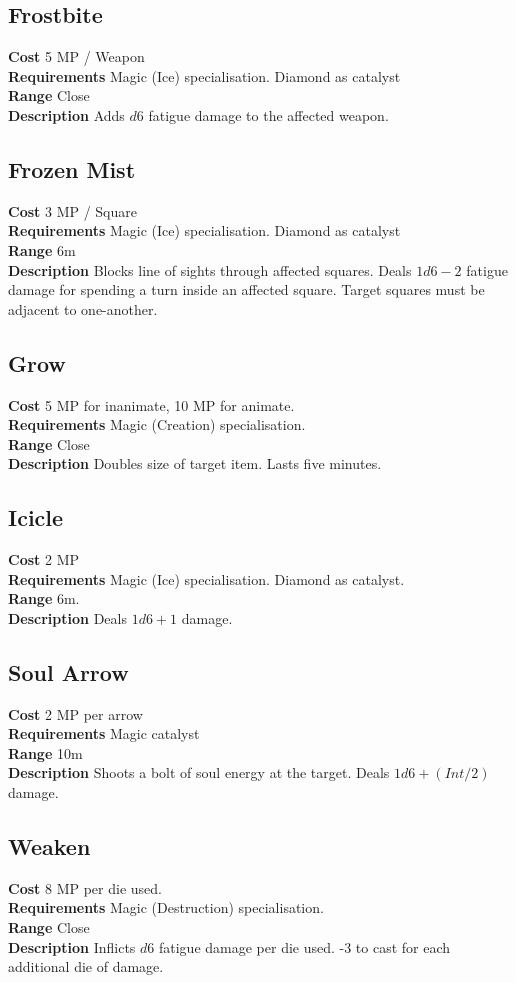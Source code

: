 \subsection*{Frostbite}
\textbf{Cost} 5 MP / Weapon\\
\textbf{Requirements} Magic (Ice) specialisation.
Diamond as catalyst\\
\textbf{Range} Close\\
\textbf{Description} Adds $d6$ fatigue damage to the affected weapon.

\subsection*{Frozen Mist} 
\textbf{Cost} 3 MP / Square\\
\textbf{Requirements} Magic (Ice) specialisation. 
Diamond as catalyst\\
\textbf{Range} 6m\\
\textbf{Description} Blocks line of sights through affected squares. 
Deals $1d6-2$ fatigue damage for spending a turn inside an affected square.
Target squares must be adjacent to one-another.

\subsection*{Grow}
\textbf{Cost} 5 MP for inanimate, 10 MP for animate.\\
\textbf{Requirements} Magic (Creation) specialisation. \\
\textbf{Range} Close\\
\textbf{Description} Doubles size of target item. 
Lasts five minutes.

\subsection*{Icicle}
\textbf{Cost} 2 MP\\
\textbf{Requirements} Magic (Ice) specialisation. 
Diamond as catalyst.\\
\textbf{Range} 6m.\\
\textbf{Description} Deals $1d6+1$ damage.

\subsection*{Soul Arrow}
\textbf{Cost} 2 MP per arrow\\
\textbf{Requirements} Magic catalyst\\
\textbf{Range} 10m\\
\textbf{Description} Shoots a bolt of soul energy at the target.
Deals $1d6 + (Int / 2)$ damage.

\subsection*{Weaken}
\textbf{Cost} 8 MP per die used.\\
\textbf{Requirements} Magic (Destruction) specialisation.\\
\textbf{Range} Close\\
\textbf{Description} Inflicts $d6$ fatigue damage per die used. 
-3 to cast for each additional die of damage.